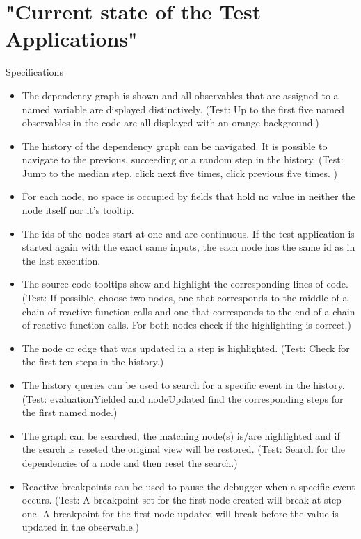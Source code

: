 		
		
	
\section{"Current state of the Test Applications"}
	Specifications
	\begin{itemize}
		\item The dependency graph is shown and all observables that are assigned to a named variable are displayed distinctively.
		(Test: Up to the first five named observables in the code are all displayed with an orange background.)
		\item The history of the dependency graph can be navigated. It is possible to navigate to the previous, succeeding or a random step in the history. (Test: Jump to the median step, click next five times, click previous five times. )
		\item For each node, no space is occupied by fields that hold no value in neither the node itself nor it's tooltip.
		\item The ids of the nodes start at one and are continuous. If the test application is started again with the exact same inputs, the each node has the same id as in the last execution.
		\item The source code tooltips show and highlight the corresponding lines of code. (Test: If possible, choose two nodes, one that corresponds to the middle of a chain of reactive function calls and one that corresponds to the end of a chain of reactive function calls. For both nodes check if the highlighting is correct.)
		\item The node or edge that was updated in a step is highlighted. (Test: Check for the first ten steps in the history.)
		\item The history queries can be used to search for a specific event in the history. (Test: evaluationYielded and nodeUpdated find the corresponding steps for the first named node.)
		\item The graph can be searched, the matching node(s) is/are highlighted and if the search is reseted the original view will be restored. (Test: Search for the dependencies of a node and then reset the search.)
		\item Reactive breakpoints can be used to pause the debugger when a specific event occurs. (Test: A breakpoint set for the first node created will break at step one. A breakpoint for the first node updated will break before the value is updated in the observable.)
	\end{itemize}
